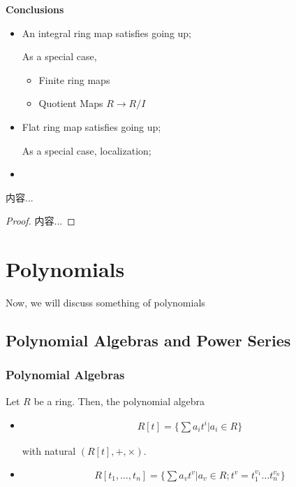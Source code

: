 \documentclass[Total.tex]{subfiles}
\begin{document}
			\textbf{Conclusions}
			\begin{itemize}
				\item An integral ring map satisfies going up;
				
				As a special case,
				\begin{itemize}
					\item Finite ring maps
					\item Quotient Maps $R\rightarrow R/I$
				\end{itemize}
				\item Flat ring map satisfies going up;
				
				As a special case, localization;
				\item 
			\end{itemize}
			
			\begin{lemma}
				内容...
			\end{lemma}
			\begin{proof}
				内容...
			\end{proof}
		\chapter{Polynomials}
		
		Now, we will discuss something of polynomials
	\section{Polynomial Algebras and Power Series}
		\subsection{Polynomial Algebras}
			\begin{Def}
				Let $R$ be a ring. Then, the polynomial algebra
				\begin{itemize}
					\item 
					\begin{gather*}
						R[t]=\{\sum a_i t^i|a_i\in R\}
					\end{gather*}
					
					with natural $(R[t],+,\times)$.
					
					\item 
					\begin{gather*}
						R[t_1,\dots,t_n]=\{\sum a_v t^v|a_v\in R;t^v=t_1^{v_1}\dots t_n^{v_n}\}
					\end{gather*}
				\end{itemize}
			\end{Def}
			
\end{document}
